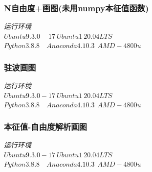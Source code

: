 \documentclass[11pt, a4paper, oneside]{ctexart}
\begin{document}
{{{\begin{appendices}
{\begin{flushright}
            \end{flushright}
        
            }
            \subsubsection{N自由度+画图(未用numpy本征值函数)}
            {    \begin{flushright}
                \scriptsize\emph{运行环境\\$Ubuntu 9.3.0-17\ Ubuntu1~20.04LTS$}\\
                \scriptsize\emph{$Python 3.8.8$\ \ $Anaconda 4.10.3\ \  AMD-4800u$}
                    
                \end{flushright}
            
                }
                \subsubsection{驻波画图}
            {    \begin{flushright}
                \scriptsize\emph{运行环境\\$Ubuntu 9.3.0-17\ Ubuntu1~20.04LTS$}\\
                \scriptsize\emph{$Python 3.8.8$\ \ $Anaconda 4.10.3\ \  AMD-4800u$}
                    
                \end{flushright}
            
                }
                \subsubsection{本征值-自由度解析画图}
                {    \begin{flushright}
                    \scriptsize\emph{运行环境\\$Ubuntu 9.3.0-17\ Ubuntu1~20.04LTS$}\\
                    \scriptsize\emph{$Python 3.8.8$\ \ $Anaconda 4.10.3\ \  AMD-4800u$}
                        
                    \end{flushright}
                
                    }


\end{appendices}}}}
\end{document}
